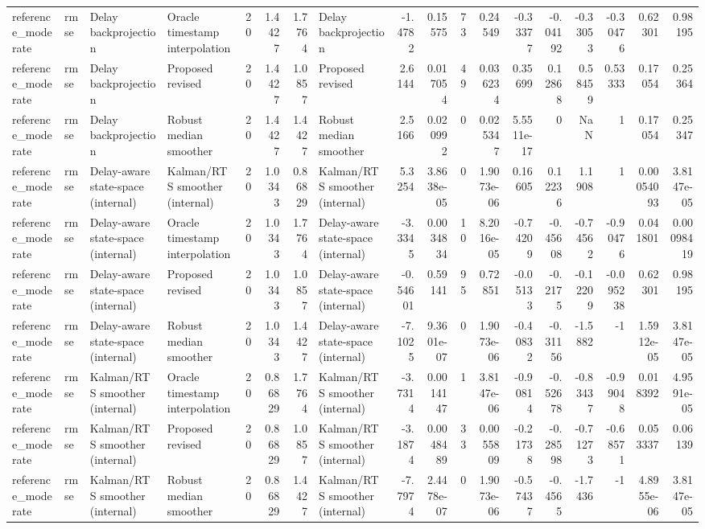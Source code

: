 \begin{table}[!htbp]
{\begin{tabular}{llllrrrlrrrrrrrrrr}
reference_moderate & rmse & Delay backprojection & Oracle timestamp interpolation & 20 & 1.4427 & 1.7764 & Delay backprojection & -1.4782 & 0.15575 & 73 & 0.24549 & -0.33377 & -0.04192 & -0.33053 & -0.30476 & 0.62301 & 0.98195 \\
reference_moderate & rmse & Delay backprojection & Proposed revised & 20 & 1.4427 & 1.0857 & Proposed revised & 2.6144 & 0.017054 & 49 & 0.036234 & 0.35699 & 0.12868 & 0.58459 & 0.53333 & 0.17054 & 0.25364 \\
reference_moderate & rmse & Delay backprojection & Robust median smoother & 20 & 1.4427 & 1.4427 & Robust median smoother & 2.5166 & 0.020992 & 0 & 0.025347 & 5.5511e-17 & 0 & NaN & 1 & 0.17054 & 0.25347 \\
reference_moderate & rmse & Delay-aware state-space (internal) & Kalman/RTS smoother (internal) & 20 & 1.0343 & 0.86829 & Kalman/RTS smoother (internal) & 5.3254 & 3.8638e-05 & 0 & 1.9073e-06 & 0.16605 & 0.12236 & 1.1908 & 1 & 0.00054093 & 3.8147e-05 \\
reference_moderate & rmse & Delay-aware state-space (internal) & Oracle timestamp interpolation & 20 & 1.0343 & 1.7764 & Delay-aware state-space (internal) & -3.3345 & 0.0034834 & 10 & 8.2016e-05 & -0.74209 & -0.45608 & -0.74562 & -0.90476 & 0.041801 & 0.00098419 \\
reference_moderate & rmse & Delay-aware state-space (internal) & Proposed revised & 20 & 1.0343 & 1.0857 & Delay-aware state-space (internal) & -0.54601 & 0.59141 & 95 & 0.72851 & -0.05133 & -0.2175 & -0.12209 & -0.095238 & 0.62301 & 0.98195 \\
reference_moderate & rmse & Delay-aware state-space (internal) & Robust median smoother & 20 & 1.0343 & 1.4427 & Delay-aware state-space (internal) & -7.1025 & 9.3601e-07 & 0 & 1.9073e-06 & -0.40832 & -0.31156 & -1.5882 & -1 & 1.5912e-05 & 3.8147e-05 \\
reference_moderate & rmse & Kalman/RTS smoother (internal) & Oracle timestamp interpolation & 20 & 0.86829 & 1.7764 & Kalman/RTS smoother (internal) & -3.7314 & 0.0014147 & 1 & 3.8147e-06 & -0.90814 & -0.52678 & -0.83437 & -0.99048 & 0.018392 & 4.9591e-05 \\
reference_moderate & rmse & Kalman/RTS smoother (internal) & Proposed revised & 20 & 0.86829 & 1.0857 & Kalman/RTS smoother (internal) & -3.1874 & 0.0048489 & 33 & 0.0055809 & -0.21738 & -0.28598 & -0.71273 & -0.68571 & 0.053337 & 0.06139 \\
reference_moderate & rmse & Kalman/RTS smoother (internal) & Robust median smoother & 20 & 0.86829 & 1.4427 & Kalman/RTS smoother (internal) & -7.7974 & 2.4478e-07 & 0 & 1.9073e-06 & -0.57437 & -0.4565 & -1.7436 & -1 & 4.8955e-06 & 3.8147e-05 \\

\end{tabular}}
\end{table}
